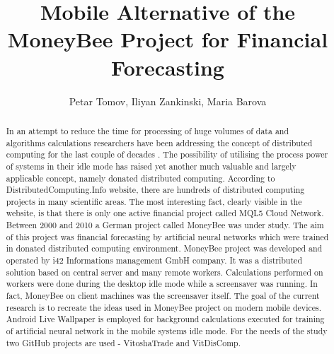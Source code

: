 \documentclass{llncs}
\begin{document}
\title{Mobile Alternative of the MoneyBee Project for Financial Forecasting} 

\author{Petar Tomov, Iliyan Zankinski, Maria Barova}




\maketitle


\begin{abstract}
In an attempt to reduce the time for processing of huge volumes of data and algorithms calculations researchers have been addressing the concept of distributed computing for the last couple of decades \cite{balabanov01,balabanov02}. The possibility of utilising the process power of systems in their idle mode has raised yet another much valuable and largely applicable concept, namely donated distributed computing. According to DistributedComputing.Info website, there are hundreds of distributed computing projects in many scientific areas. The most interesting fact, clearly visible in the website, is that there is only one active financial project called MQL5 Cloud Network. Between 2000 and 2010 a German project called MoneyBee was under study. The aim of this project was financial forecasting by artificial neural networks which were trained in donated distributed computing environment. MoneyBee project was developed and operated by i42 Informations management GmbH company. It was a distributed solution based on central server and many remote workers. Calculations performed on workers were done during the desktop idle mode while a screensaver was running. In fact, MoneyBee on client machines was the screensaver itself. The goal of the current research is to recreate the ideas used in MoneyBee project on modern mobile devices. Android Live Wallpaper is employed for background calculations executed for training of artificial neural network \cite{keremedchiev01} in the mobile systems idle mode. For the needs of the study two GitHub projects are used - VitoshaTrade and VitDisComp.

\end{abstract}
\end{document}
